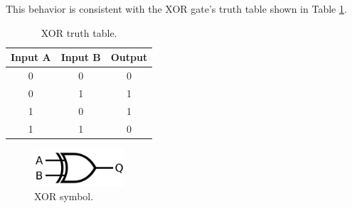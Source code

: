     \noindent
    This behavior is consistent with the XOR gate's truth table shown in Table \ref{tab:XOR_table}. \\

    \begin{table}[ht]
        \centering
        \begin{tabular}{|c|c|c|}
            \hline
            Input A & Input B & Output \\
            \hline
            0 & 0 & 0 \\
            0 & 1 & 1 \\
            1 & 0 & 1 \\
            1 & 1 & 0 \\
            \hline
        \end{tabular}
        \caption{XOR truth table.}
        \label{tab:XOR_table}
    \end{table}   
    
    \begin{figure}[H]
	    \centering
	    \includegraphics[width=0.3\textwidth]{figures/symbols/XOR.png}
	    \caption{XOR symbol.}
	    \label{fig:XOR_sym} 
	\end{figure}